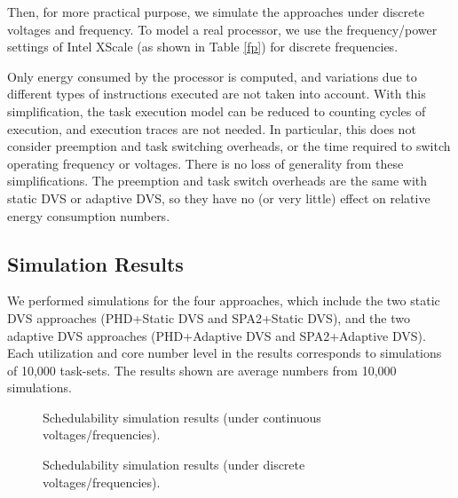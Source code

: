 \documentclass[12pt, journal,compsoc]{IEEEtran}
\begin{document}
Then, for more practical purpose, we simulate the approaches under discrete voltages and frequency. To model a real processor, we use the frequency/power settings of Intel XScale \cite{Xu:2004:PPE:1017753.1017767}(as shown in Table \ref{fp}) for discrete frequencies.

Only energy consumed by the processor is computed, and variations due to different types of instructions executed are not taken into account. With this simplification, the task execution model can be reduced to counting cycles of execution, and execution traces are not needed. In particular, this does not consider preemption and task switching overheads, or the time required to switch operating frequency or voltages. There is no loss of generality from these simplifications. The preemption and task switch overheads are the same with static DVS or adaptive DVS, so they have no (or very little) effect on relative energy consumption numbers.



\subsection{Simulation Results}

We performed simulations for the four approaches, which
include the two static DVS approaches (PHD+Static DVS and SPA2+Static DVS),
and the two adaptive DVS approaches (PHD+Adaptive DVS and SPA2+Adaptive DVS).
Each utilization and core number level in the
results corresponds to simulations of 10,000 task-sets.
The results shown are average numbers from 10,000 simulations.

\begin{figure*}[!t]
\centering
{}
\hspace{-0.2in}
\hspace{-0.2in}
\hspace{-0.2in}
\caption{Schedulability simulation results (under continuous voltages/frequencies).}
\label{s}
\end{figure*}

\begin{figure*}[!t]
\centering
{}
\hspace{-0.2in}
\hspace{-0.2in}
\hspace{-0.2in}
\caption{Schedulability simulation results (under discrete voltages/frequencies).}
\label{ds}
\end{figure*}
\end{document}
